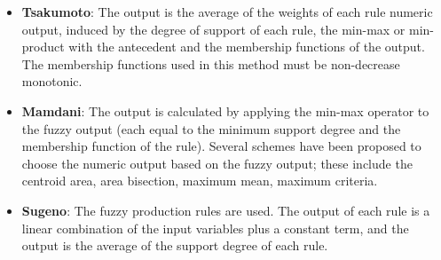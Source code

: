 \begin{itemize} 
\item \textbf{Tsakumoto}: The output is the average of the 
weights of each rule numeric output, induced by the degree of 
support of each rule, the min-max or min-product with the 
antecedent and the membership functions of the output. The 
membership functions used in this method must be 
non-decrease monotonic. 
\item \textbf{Mamdani}: The output is calculated by applying 
the min-max operator to the fuzzy output (each equal to the 
minimum support degree and the membership function of the rule). 
Several schemes have been proposed to choose the numeric output 
based on the fuzzy output; these include the centroid area, 
area bisection, maximum mean, maximum criteria.
\item \textbf{Sugeno}: The fuzzy production rules are used. The 
output of each rule is a linear combination of the input 
variables plus a constant term, and the output is the average 
of the support degree of each rule.
\end{itemize} 

